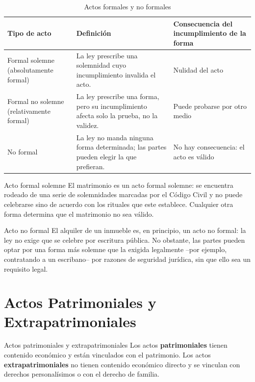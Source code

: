 \documentclass[12pt,oneside]{book}
\begin{document}
\begin{table}[H]
\centering
\begin{tabularx}{\textwidth}{l X X}
\toprule
\textbf{Tipo de acto} & \textbf{Definición} & \textbf{Consecuencia del incumplimiento de la forma} \\
\midrule
Formal solemne (absolutamente formal) & La ley prescribe una solemnidad cuyo incumplimiento invalida el acto. & Nulidad del acto \\
Formal no solemne (relativamente formal) & La ley prescribe una forma, pero su incumplimiento afecta solo la prueba, no la validez. & Puede probarse por otro medio \\
No formal & La ley no manda ninguna forma determinada; las partes pueden elegir la que prefieran. & No hay consecuencia: el acto es válido \\
\bottomrule
\end{tabularx}
\caption{Actos formales y no formales}
\end{table}

\begin{example}{Acto formal solemne}
El matrimonio es un acto formal solemne: se encuentra rodeado de una serie de solemnidades marcadas por el Código Civil y no puede celebrarse sino de acuerdo con los rituales que este establece. Cualquier otra forma determina que el matrimonio no sea válido.
\end{example}

\begin{example}{Acto no formal}
El alquiler de un inmueble es, en principio, un acto no formal: la ley no exige que se celebre por escritura pública. No obstante, las partes pueden optar por una forma más solemne que la exigida legalmente --por ejemplo, contratando a un escribano-- por razones de seguridad jurídica, sin que ello sea un requisito legal.
\end{example}

\section{Actos Patrimoniales y Extrapatrimoniales}

\begin{definition}{Actos patrimoniales y extrapatrimoniales}
Los actos \textbf{patrimoniales} tienen contenido económico y están vinculados con el patrimonio. Los actos \textbf{extrapatrimoniales} no tienen contenido económico directo y se vinculan con derechos personalísimos o con el derecho de familia.
\end{definition}
\end{document}
